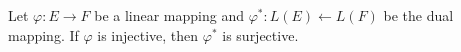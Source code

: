 Let $\varphi: E \rightarrow F$ be a linear mapping and $\varphi^*: L(E) \leftarrow L(F)$ be the dual mapping. If $\varphi$ is injective, then $\varphi^*$ is surjective.
